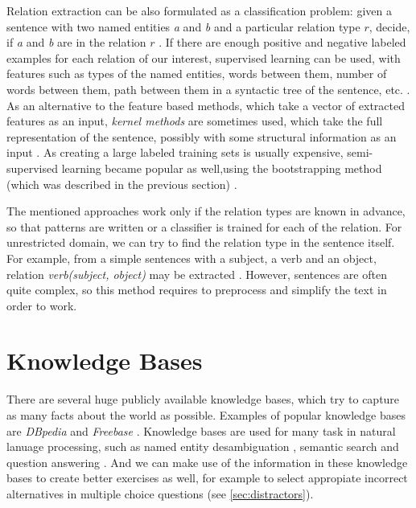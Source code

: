 \documentclass[12pt, twoside]{fithesis2}		%
\renewcommand{\_}{\leavevmode \kern0.07em\vbox{\hrule width0.4em}}
\newcounter{choice}
\begin{document}

Relation extraction can be also formulated as a classification problem:
given a sentence with two named entities \emph{a} and \emph{b} and a particular relation type $r$,
decide, if \emph{a} and \emph{b} are in the relation $r$ \cite{rel-extract-review}.
If there are enough positive and negative labeled examples for each relation of our interest,
supervised learning can be used, with features such as
types of the named entities, words between them,
number of words between them, path between them in a syntactic tree of the sentence, etc.
\cite{rel-extract-feature-based}.
As an alternative to the feature based methods, which take a vector of extracted features as an input,
\emph{kernel methods} are sometimes used, which take the full representation of the sentence, possibly with some structural information as an input \cite{rel-extract-kernel}.
As creating a large labeled training sets is usually expensive, semi-supervised learning became popular as well,using the bootstrapping method (which was described in the previous section) \cite{rel-extract-bootstrapping}.

The mentioned approaches work only if the relation types are known in advance,
so that patterns are written or a classifier is trained for each of the relation.
For unrestricted domain,
we can try to find the relation type in the sentence itself.
For example, from a simple sentences with a subject, a verb and an object,
relation \emph{verb(subject, object)} may be extracted \cite{triples-acquisition}.
However, sentences are often quite complex, so this method requires to preprocess and simplify the text in order to work.

\section{Knowledge Bases}
\label{sec:knowledge-bases}

There are several huge publicly available knowledge bases,
which try to capture as many facts about the world as possible.
Examples of popular knowledge bases are
\textit{DBpedia} \cite{dbpedia}
and \textit{Freebase} \cite{freebase}.
Knowledge bases are used for many task in natural lanuage processing,
such as
named entity desambiguation \cite{dbpedia-spotlight},
semantic search and question answering \cite{watson}.
And we can make use of the information in these knowledge bases to create better exercises as well,
for example to select appropiate incorrect alternatives in multiple choice questions
(see \autoref{sec:distractors}).
\end{document}
